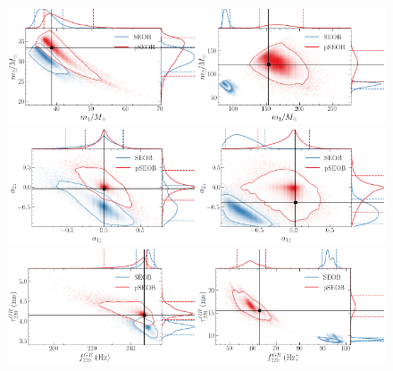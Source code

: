 \documentclass[twocolumn,prd,aps,superscriptaddress,preprintnumbers,tightenlines,showpacs,nofootinbib,eqsecnum,amsfonts,amsmath]{revtex4-1}
\begin{document}
\begin{figure}%
	\includegraphics[width=0.5\textwidth]{figures/GW150914_simulated_signal_0p5_gr_ngr_m1m2.png}\includegraphics[width=0.5\textwidth]{figures/GW190521_simulated_signal_0p5_gr_ngr_m1m2.png}
	\includegraphics[width=0.5\textwidth]{figures/GW150914_simulated_signal_0p5_gr_ngr_a1za2z.png}\includegraphics[width=0.5\textwidth]{figures/GW190521_simulated_signal_0p5_gr_ngr_a1za2z.png}	
	\includegraphics[width=0.5\textwidth]{figures/GW150914_simulated_signal_0p5_gr_ngr_fgrtaugr.png}\includegraphics[width=0.5\textwidth]{figures/GW190521_simulated_signal_0p5_gr_ngr_fgrtaugr.png}

\end{figure}
\end{document}
